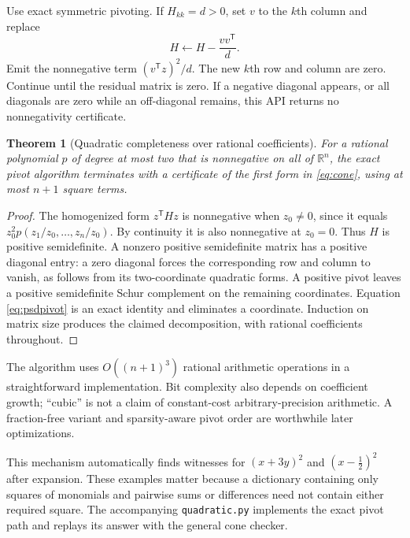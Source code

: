 \documentclass[11pt,letterpaper]{article}
\newcommand{\R}{\mathbb{R}}
\newtheorem{theorem}[proposition]{Theorem}
\theoremstyle{definition}
\theoremstyle{remark}
\begin{document}
Use exact symmetric pivoting. If $H_{kk}=d>0$, set $v$ to the $k$th column and replace
\begin{equation}\label{eq:psdpivot}
H\leftarrow H-\frac{vv^\mathsf{T}}{d}.
\end{equation}
Emit the nonnegative term $(v^\mathsf{T}z)^2/d$. The new $k$th row and column are zero. Continue until the residual matrix is zero. If a negative diagonal appears, or all diagonals are zero while an off-diagonal remains, this API returns no nonnegativity certificate.

\begin{theorem}[Quadratic completeness over rational coefficients]
For a rational polynomial $p$ of degree at most two that is nonnegative on all of $\R^n$, the exact pivot algorithm terminates with a certificate of the first form in \eqref{eq:cone}, using at most $n+1$ square terms.
\end{theorem}
\begin{proof}
The homogenized form $z^\mathsf{T}Hz$ is nonnegative when $z_0\ne0$, since it equals $z_0^2p(z_1/z_0,\ldots,z_n/z_0)$. By continuity it is also nonnegative at $z_0=0$. Thus $H$ is positive semidefinite. A nonzero positive semidefinite matrix has a positive diagonal entry: a zero diagonal forces the corresponding row and column to vanish, as follows from its two-coordinate quadratic forms. A positive pivot leaves a positive semidefinite Schur complement on the remaining coordinates. Equation \eqref{eq:psdpivot} is an exact identity and eliminates a coordinate. Induction on matrix size produces the claimed decomposition, with rational coefficients throughout.
\end{proof}
The algorithm uses $O((n+1)^3)$ rational arithmetic operations in a straightforward implementation. Bit complexity also depends on coefficient growth; ``cubic'' is not a claim of constant-cost arbitrary-precision arithmetic. A fraction-free variant and sparsity-aware pivot order are worthwhile later optimizations.

This mechanism automatically finds witnesses for $(x+3y)^2$ and $(x-\tfrac12)^2$ after expansion. These examples matter because a dictionary containing only squares of monomials and pairwise sums or differences need not contain either required square. The accompanying \texttt{quadratic.py} implements the exact pivot path and replays its answer with the general cone checker.
\end{document}
